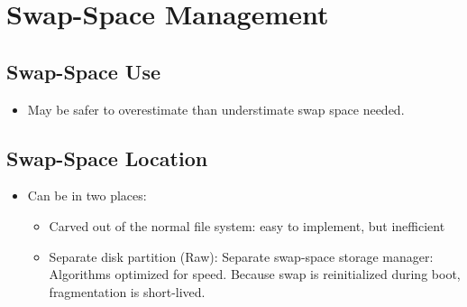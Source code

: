 \documentclass[10pt]{report}
\begin{document}
	\section{Swap-Space Management}
		\subsection{Swap-Space Use}
			\begin{itemize}
				\item May be safer to overestimate than understimate swap space needed.
			\end{itemize}

		\subsection{Swap-Space Location}
			\begin{itemize}
				\item Can be in two places:
				\begin{itemize}
					\item Carved out of the normal file system: easy to implement, but inefficient
					\item Separate disk partition (Raw): Separate swap-space storage manager: Algorithms optimized for speed. Because swap is reinitialized during boot, fragmentation is short-lived.
				\end{itemize}
			\end{itemize}
\end{document}
